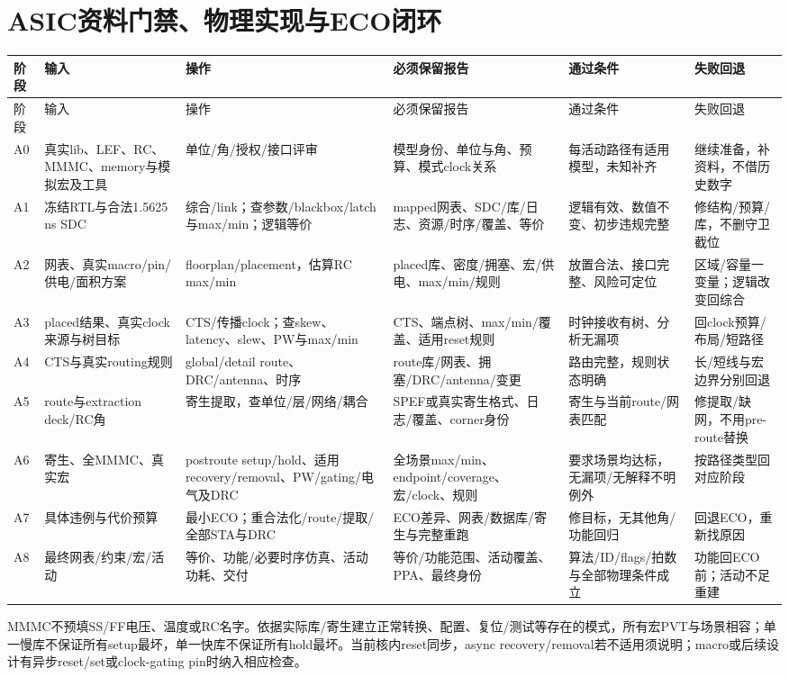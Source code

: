 \section{ASIC资料门禁、物理实现与ECO闭环}
\begingroup\scriptsize\setlength{\tabcolsep}{3pt}
\begin{longtable}{p{12mm}p{25mm}p{29mm}p{35mm}p{28mm}p{24mm}}
\toprule 阶段&输入&操作&必须保留报告&通过条件&失败回退\\\midrule\endfirsthead
\toprule 阶段&输入&操作&必须保留报告&通过条件&失败回退\\\midrule\endhead
A0&真实lib、LEF、RC、MMMC、memory与模拟宏及工具&单位/角/授权/接口评审&模型身份、单位与角、预算、模式clock关系&每活动路径有适用模型，未知补齐&继续准备，补资料，不借历史数字\\
A1&冻结RTL与合法1.5625\,ns SDC&综合/link；查参数/blackbox/latch与max/min；逻辑等价&mapped网表、SDC/库/日志、资源/时序/覆盖、等价&逻辑有效、数值不变、初步违规完整&修结构/预算/库，不删守卫截位\\
A2&网表、真实macro/pin/供电/面积方案&floorplan/placement，估算RC max/min&placed库、密度/拥塞、宏/供电、max/min/规则&放置合法、接口完整、风险可定位&区域/容量一变量；逻辑改变回综合\\
A3&placed结果、真实clock来源与树目标&CTS/传播clock；查skew、latency、slew、PW与max/min&CTS、端点树、max/min/覆盖、适用reset规则&时钟接收有树、分析无漏项&回clock预算/布局/短路径\\
A4&CTS与真实routing规则&global/detail route、DRC/antenna、时序&route库/网表、拥塞/DRC/antenna/变更&路由完整，规则状态明确&长/短线与宏边界分别回退\\
A5&route与extraction deck/RC角&寄生提取，查单位/层/网络/耦合&SPEF或真实寄生格式、日志/覆盖、corner身份&寄生与当前route/网表匹配&修提取/缺网，不用pre-route替换\\
A6&寄生、全MMMC、真实宏&postroute setup/hold、适用recovery/removal、PW/gating/电气及DRC&全场景max/min、endpoint/coverage、宏/clock、规则&要求场景均达标，无漏项/无解释不明例外&按路径类型回对应阶段\\
A7&具体违例与代价预算&最小ECO；重合法化/route/提取/全部STA与DRC&ECO差异、网表/数据库/寄生与完整重跑&修目标，无其他角/功能回归&回退ECO，重新找原因\\
A8&最终网表/约束/宏/活动&等价、功能/必要时序仿真、活动功耗、交付&等价/功能范围、活动覆盖、PPA、最终身份&算法/ID/flags/拍数与全部物理条件成立&功能回ECO前；活动不足重建\\
\bottomrule\end{longtable}\endgroup
MMMC不预填SS/FF电压、温度或RC名字。依据实际库/寄生建立正常转换、配置、复位/测试等存在的模式，所有宏PVT与场景相容；单一慢库不保证所有setup最坏，单一快库不保证所有hold最坏。当前核内reset同步，async recovery/removal若不适用须说明；macro或后续设计有异步reset/set或clock-gating pin时纳入相应检查。

